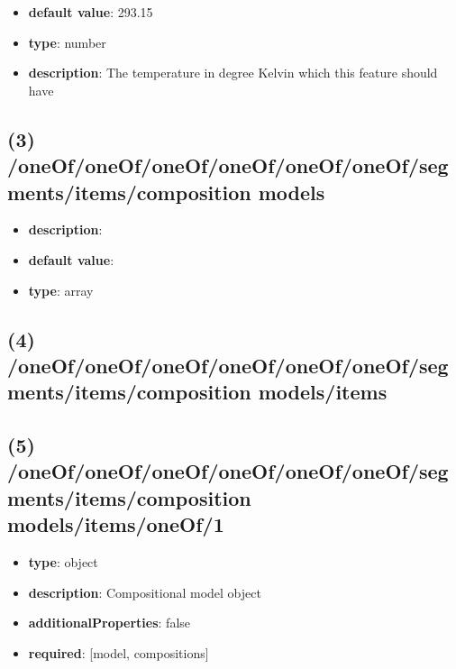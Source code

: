 \begin{itemize}[leftmargin=6em]\item {\bf default value}: 293.15
\item {\bf type}: number
\item {\bf description}: The temperature in degree Kelvin which this feature should have
\end{itemize}\subsection{(3) /oneOf/oneOf/oneOf/oneOf/oneOf/oneOf/segments/items/composition models}
\begin{itemize}[leftmargin=3em]\item {\bf description}: 
\item {\bf default value}: 
\item {\bf type}: array
\end{itemize}\subsection{(4) /oneOf/oneOf/oneOf/oneOf/oneOf/oneOf/segments/items/composition models/items}

\subsection{(5) /oneOf/oneOf/oneOf/oneOf/oneOf/oneOf/segments/items/composition models/items/oneOf/1}
\begin{itemize}[leftmargin=5em]\item {\bf type}: object
\item {\bf description}: Compositional model object
\item {\bf additionalProperties}: false
\item {\bf required}: [model, compositions]\end{itemize}
